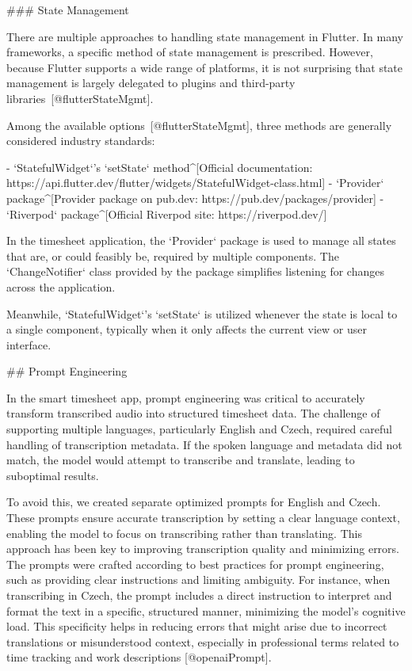 \documentclass[
  digital,     %
  oneside,     %
  nosansbold,  %
  nocolorbold, %
  lof,         %
  lot,         %
]{fithesis4}
\begin{document}
\begin{markdown}

### State Management

There are multiple approaches to handling state management in Flutter. In many frameworks, a specific method of state management is prescribed. However, because Flutter supports a wide range of platforms, it is not surprising that state management is largely delegated to plugins and third-party libraries~[@flutterStateMgmt].

Among the available options~[@flutterStateMgmt], three methods are generally considered industry standards:

- `StatefulWidget`'s `setState` method^[Official documentation: https://api.flutter.dev/flutter/widgets/StatefulWidget-class.html]
- `Provider` package^[Provider package on pub.dev: https://pub.dev/packages/provider]
- `Riverpod` package^[Official Riverpod site: https://riverpod.dev/]

In the timesheet application, the `Provider` package is used to manage all states that are, or could feasibly be, required by multiple components. The `ChangeNotifier` class provided by the package simplifies listening for changes across the application.

Meanwhile, `StatefulWidget`'s `setState` is utilized whenever the state is local to a single component, typically when it only affects the current view or user interface.

## Prompt Engineering

In the smart timesheet app, prompt engineering was critical to accurately transform transcribed audio into structured timesheet data. The challenge of supporting multiple languages, particularly English and Czech, required careful handling of transcription metadata. If the spoken language and metadata did not match, the model would attempt to transcribe and translate, leading to suboptimal results.

To avoid this, we created separate optimized prompts for English and Czech. These prompts ensure accurate transcription by setting a clear language context, enabling the model to focus on transcribing rather than translating. This approach has been key to improving transcription quality and minimizing errors. The prompts were crafted according to best practices for prompt engineering, such as providing clear instructions and limiting ambiguity. For instance, when transcribing in Czech, the prompt includes a direct instruction to interpret and format the text in a specific, structured manner, minimizing the model’s cognitive load. This specificity helps in reducing errors that might arise due to incorrect translations or misunderstood context, especially in professional terms related to time tracking and work descriptions [@openaiPrompt].


\end{markdown}
\end{document}
